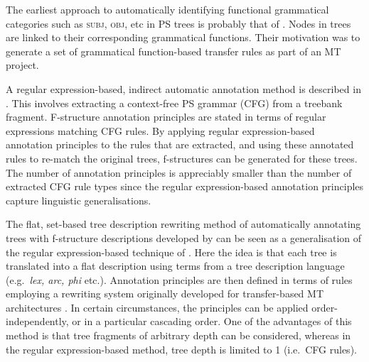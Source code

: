 \documentclass[output=paper,hidelinks]{langscibook}
\begin{document}

The earliest approach to automatically identifying functional grammatical categories such as {\normalfont \scshape subj}, {\normalfont \scshape obj}, etc in PS trees is probably that of \citet{Lappinetal:89}. Nodes in trees are linked to their corresponding grammatical functions. Their motivation was to generate a set of grammatical function-based transfer rules as part of an MT project.


\hspace*{-.1pt}A regular expression-based, indirect automatic annotation method is described in \citet{S-vG-W-00}. This involves extracting a context-free PS grammar (CFG) from a treebank fragment. F-structure annotation principles are stated in terms of regular expressions matching CFG rules. By applying regular expression-based annotation principles to the rules that are extracted, and using these annotated rules to re-match the original trees, f-structures can be generated for these trees. The number of annotation principles is appreciably smaller than the number of extracted CFG rule types since the regular expression-based annotation principles capture linguistic generalisations.

The flat, set-based tree description rewriting method of automatically annotating trees with f-structure descriptions developed by \citet{Frank:00} can be seen as a generalisation of the regular expression-based technique of \citet{S-vG-W-00}. Here the idea is that each tree is translated into a flat description using terms from a tree description language (e.g.\ {\em lex, arc, phi} etc.). Annotation principles are then defined in terms of rules employing a rewriting system originally developed for transfer-based MT architectures \citep{Kayetal:1994}. In certain circumstances, the principles can be applied order-independently, or in a particular cascading order. One of the advantages of this method is that tree fragments of arbitrary depth can be considered, whereas in the regular expression-based method, tree depth is limited to 1 (i.e.\ CFG rules).
\end{document}
